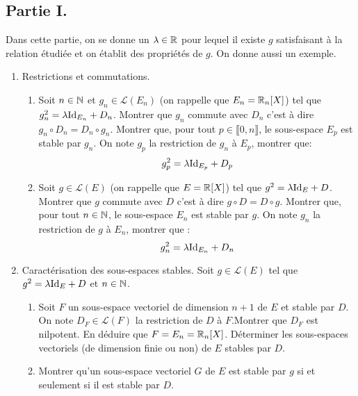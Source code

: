 \subsection*{Partie I.}
Dans cette partie, on se donne un $\lambda \in \mathbb{R}$ pour lequel il existe $g$ satisfaisant à la relation étudiée et on établit des propriétés de $g$. On donne aussi un exemple.
\begin{enumerate}
   \item Restrictions et commutations.
\begin{enumerate}
 \item Soit $n\in \mathbb{N}$ et $g_n \in \mathcal{L}(E_n)$ (on rappelle que $E_n = \mathbb{R}_n[X]$) tel que $g_n^2 = \lambda {\operatorname{Id}}_{E_n}+ D_n$.\newline
Montrer que $g_n$ commute avec $D_n$ c'est à dire $g_n\circ D_n = D_n \circ g_n$.\newline
Montrer que, pour tout $p\in \llbracket 0,n\rrbracket$, le sous-espace $E_p$ est stable par $g_n$. On note $g_p$ la restriction de $g_n$ à $E_p$, montrer que:
\begin{displaymath}
 g_p^2 = \lambda {\operatorname{Id}}_{E_p} + D_p
\end{displaymath}
 \item Soit $g\in \mathcal{L}(E)$ (on rappelle que $E=\mathbb{R}[X]$) tel que $g^2 = \lambda {\operatorname{Id}}_{E}+ D$.\newline
Montrer que $g$ commute avec $D$ c'est à dire $g\circ D = D \circ g$.\newline
Montrer que, pour tout $n\in \mathbb{N}$, le sous-espace $E_n$ est stable par $g$. On note $g_n$ la restriction de $g$ à $E_n$, montrer que :
\begin{displaymath}
 g_n^2 = \lambda {\operatorname{Id}}_{E_n} + D_n
\end{displaymath}
\end{enumerate}

    \item Caractérisation des sous-espaces stables.\newline
Soit $g \in \mathcal{L}(E)$ tel que $g^2 = \lambda {\operatorname{Id}}_{E}+ D$ et $n\in \mathbb{N}$.
\begin{enumerate}
\item Soit $F$ un sous-espace vectoriel de dimension $n+1$ de $E$ et stable par $D$. On note $D_F \in \mathcal{L}(F)$ la restriction de $D$ à $F$.\newline Montrer que $D_F$ est nilpotent. En déduire que $F=E_n=\mathbb{R}_n[X]$.\newline
Déterminer les sous-espaces vectoriels (de dimension finie ou non) de $E$ stables par $D$.
\item Montrer qu'un sous-espace vectoriel $G$ de $E$ est stable par $g$ si et seulement si il est stable par $D$.


\end{enumerate}
\end{enumerate}
